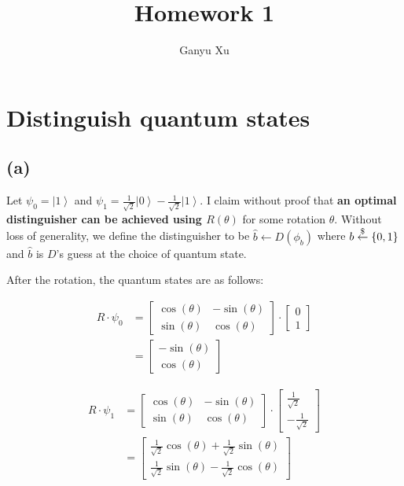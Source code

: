 \documentclass{article}
\title{
    Homework 1
}
\author{
    Ganyu Xu
}
\newcommand{\qket}[1]{\left\lvert {#1} \right\rangle}
\begin{document}
\maketitle

\section{Distinguish quantum states}
\subsection*{(a)}
Let $\psi_0 = \qket{1}$ and $\psi_1 = \frac{1}{\sqrt{2}}\qket{0} - \frac{1}{\sqrt{2}}\qket{1}$. I claim without proof that \textbf{an optimal distinguisher can be achieved using $R(\theta)$} for some rotation $\theta$. Without loss of generality, we define the distinguisher to be $\hat{b} \leftarrow D(\phi_b)$ where $b \stackrel{\$}{\leftarrow} \{0,1\}$ and $\hat{b}$ is $D$'s guess at the choice of quantum state.

After the rotation, the quantum states are as follows:

\begin{equation*}
    \begin{aligned}
        R \cdot \psi_0 &= \begin{bmatrix}
            \cos(\theta) & -\sin(\theta) \\
            \sin(\theta) & \cos(\theta)
        \end{bmatrix} \cdot \begin{bmatrix}
            0 \\ 1
        \end{bmatrix} \\
        &= \begin{bmatrix}
            -\sin(\theta) \\ \cos(\theta)
        \end{bmatrix}
    \end{aligned}
\end{equation*}

\begin{equation*}
    \begin{aligned}
        R \cdot \psi_1 &= \begin{bmatrix}
            \cos(\theta) & -\sin(\theta) \\
            \sin(\theta) & \cos(\theta)
        \end{bmatrix} \cdot \begin{bmatrix}
            \frac{1}{\sqrt{2}} \\ -\frac{1}{\sqrt{2}}
        \end{bmatrix} \\
        &= \begin{bmatrix}
            \frac{1}{\sqrt{2}}\cos(\theta) + \frac{1}{\sqrt{2}}\sin(\theta) \\
            \frac{1}{\sqrt{2}}\sin(\theta) - \frac{1}{\sqrt{2}}\cos(\theta)
        \end{bmatrix}
    \end{aligned}
\end{equation*}
\end{document}

